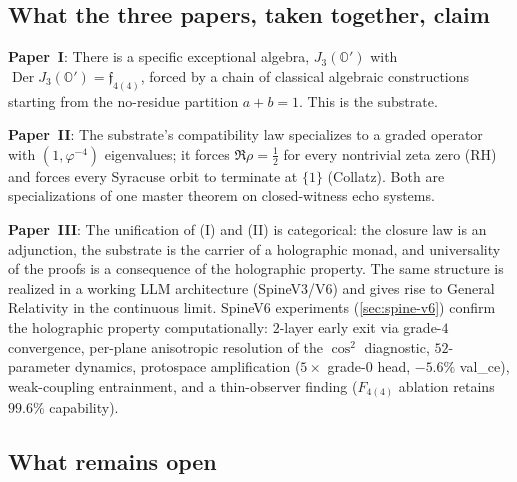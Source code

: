 \documentclass[11pt,a4paper]{article}
\theoremstyle{plain}
\theoremstyle{definition}
\theoremstyle{remark}
\numberwithin{equation}{section}
\providecommand{\Os}{\mathbb{O}'}
\providecommand{\vp}{\varphi}
\providecommand{\half}{\tfrac{1}{2}}
\providecommand{\fk}[1]{\mathfrak{#1}}
\DeclareMathOperator{\Der}{Der}
\begin{document}
\subsection*{What the three papers, taken together, claim}

\textbf{Paper~I}: There is a specific exceptional algebra,
$J_3(\Os)$ with $\Der J_3(\Os) = \fk{f}_{4(4)}$, forced by a
chain of classical algebraic constructions starting from the
no-residue partition $a + b = 1$.  This is the substrate.

\textbf{Paper~II}: The substrate's compatibility law specializes
to a graded operator with $(1, \vp^{-4})$ eigenvalues; it forces
$\Re\rho = \half$ for every nontrivial zeta zero (RH) and forces
every Syracuse orbit to terminate at $\{1\}$ (Collatz).  Both are
specializations of one master theorem on closed-witness echo
systems.

\textbf{Paper~III}: The unification of (I) and (II) is
categorical: the closure law is an adjunction, the substrate is
the carrier of a holographic monad, and universality of the
proofs is a consequence of the holographic property.  The same
structure is realized in a working LLM architecture (SpineV3/V6)
and gives rise to General Relativity in the continuous limit.
SpineV6 experiments (\cref{sec:spine-v6}) confirm the holographic
property computationally: $2$-layer early exit via grade-$4$
convergence, per-plane anisotropic resolution of the $\cos^2$
diagnostic, $52$-parameter dynamics, protospace amplification
($5\times$ grade-$0$ head, $-5.6\%$ val\_ce), weak-coupling
entrainment, and a thin-observer finding ($F_{4(4)}$ ablation
retains $99.6\%$ capability).

\subsection*{What remains open}
\end{document}
